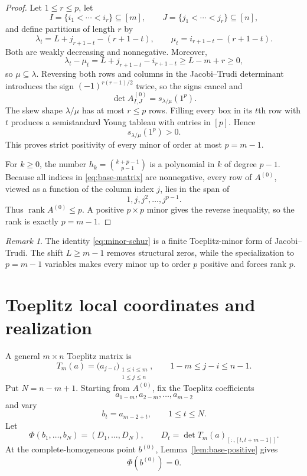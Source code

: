 \documentclass{amsart}
\numberwithin{equation}{section}
\theoremstyle{definition}
\theoremstyle{remark}
\newtheorem{remark}[theorem]{Remark}
\DeclareMathOperator{\rank}{rank}
\begin{document}
\begin{proof}
Let $1\le r\le p$, let
\[
 I=\{i_1<\cdots<i_r\}\subseteq[m],
 \qquad
 J=\{j_1<\cdots<j_r\}\subseteq[n],
\]
and define partitions of length $r$ by
\begin{equation}\label{eq:lambda-mu}
 \lambda_t=L+j_{r+1-t}-(r+1-t),
 \qquad
 \mu_t=i_{r+1-t}-(r+1-t).
\end{equation}
Both are weakly decreasing and nonnegative.  Moreover,
\[
 \lambda_t-\mu_t=L+j_{r+1-t}-i_{r+1-t}\ge L-m+r\ge0,
\]
so $\mu\subseteq\lambda$.  Reversing both rows and columns in the Jacobi--Trudi determinant introduces the sign $(-1)^{r(r-1)/2}$ twice, so the signs cancel and
\begin{equation}\label{eq:minor-schur}
 \det A^{(0)}_{I,J}=s_{\lambda/\mu}(1^p).
\end{equation}
The skew shape $\lambda/\mu$ has at most $r\le p$ rows.  Filling every box in its $t$th row with $t$ produces a semistandard Young tableau with entries in $[p]$.  Hence
\[
 s_{\lambda/\mu}(1^p)>0.
\]
This proves strict positivity of every minor of order at most $p=m-1$.

For $k\ge0$, the number $h_k=\binom{k+p-1}{p-1}$ is a polynomial in $k$ of degree $p-1$.  Because all indices in \eqref{eq:base-matrix} are nonnegative, every row of $A^{(0)}$, viewed as a function of the column index $j$, lies in the span of
\[
 1,j,j^2,\ldots,j^{p-1}.
\]
Thus $\rank A^{(0)}\le p$.  A positive $p\times p$ minor gives the reverse inequality, so the rank is exactly $p=m-1$.
\end{proof}

\begin{remark}
The identity \eqref{eq:minor-schur} is a finite Toeplitz-minor form of Jacobi--Trudi.  The shift $L\ge m-1$ removes structural zeros, while the specialization to $p=m-1$ variables makes every minor up to order $p$ positive and forces rank $p$.
\end{remark}

\section{Toeplitz local coordinates and realization}\label{sec:realization}

A general $m\times n$ Toeplitz matrix is
\begin{equation}\label{eq:toeplitz-general}
 T_m(a)=\bigl(a_{j-i}\bigr)_{\substack{1\le i\le m\\1\le j\le n}},
 \qquad 1-m\le j-i\le n-1.
\end{equation}
Put $N=n-m+1$.  Starting from $A^{(0)}$, fix the Toeplitz coefficients
\[
 a_{1-m},a_{2-m},\ldots,a_{m-2}
\]
and vary
\begin{equation}\label{eq:b-variables}
 b_t=a_{m-2+t},
 \qquad 1\le t\le N.
\end{equation}
Let
\begin{equation}\label{eq:Phi}
 \Phi(b_1,\ldots,b_N)=(D_1,\ldots,D_N),
 \qquad
 D_t=\det T_m(a)_{[:,[t,t+m-1]]}.
\end{equation}
At the complete-homogeneous point $b^{(0)}$, Lemma~\ref{lem:base-positive} gives
\[
 \Phi(b^{(0)})=0.
\]
\end{document}
